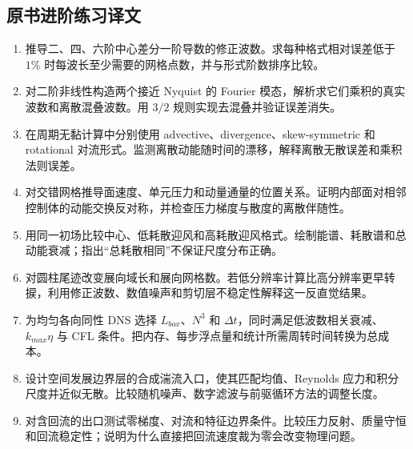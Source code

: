 \documentclass[12pt,a4paper,openany,fontset=none]{ctexbook}
\begin{document}
\subsection*{原书进阶练习译文}
\begin{enumerate}[label=\arabic*.]
 \item 推导二、四、六阶中心差分一阶导数的修正波数。求每种格式相对误差低于 $1\%$ 时每波长至少需要的网格点数，并与形式阶数排序比较。
 \item 对二阶非线性构造两个接近 Nyquist 的 Fourier 模态，解析求它们乘积的真实波数和离散混叠波数。用 $3/2$ 规则实现去混叠并验证误差消失。
 \item 在周期无黏计算中分别使用 advective、divergence、skew-symmetric 和 rotational 对流形式。监测离散动能随时间的漂移，解释离散无散误差和乘积法则误差。
 \item 对交错网格推导面速度、单元压力和动量通量的位置关系。证明内部面对相邻控制体的动能交换反对称，并检查压力梯度与散度的离散伴随性。
 \item 用同一初场比较中心、低耗散迎风和高耗散迎风格式。绘制能谱、耗散谱和总动能衰减；指出“总耗散相同”不保证尺度分布正确。
 \item 对圆柱尾迹改变展向域长和展向网格数。若低分辨率计算比高分辨率更早转捩，利用修正波数、数值噪声和剪切层不稳定性解释这一反直觉结果。
 \item 为均匀各向同性 DNS 选择 $L_{box}$、$N^3$ 和 $\Delta t$，同时满足低波数相关衰减、$k_{max}\eta$ 与 CFL 条件。把内存、每步浮点量和统计所需周转时间转换为总成本。
 \item 设计空间发展边界层的合成湍流入口，使其匹配均值、Reynolds 应力和积分尺度并近似无散。比较随机噪声、数字滤波与前驱循环方法的调整长度。
 \item 对含回流的出口测试零梯度、对流和特征边界条件。比较压力反射、质量守恒和回流稳定性；说明为什么直接把回流速度裁为零会改变物理问题。
\end{enumerate}
\backmatter
\end{document}
